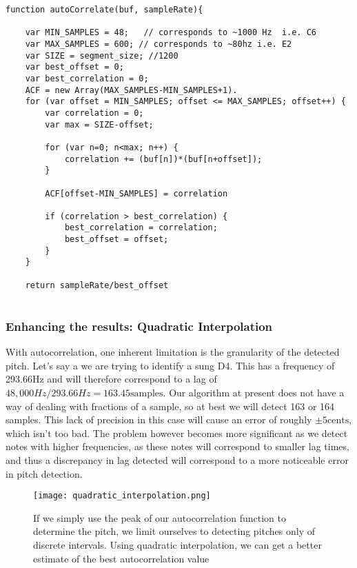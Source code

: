 \begin{lstlisting}
function autoCorrelate(buf, sampleRate){

    var MIN_SAMPLES = 48;	// corresponds to ~1000 Hz  i.e. C6
    var MAX_SAMPLES = 600; // corresponds to ~80hz i.e. E2
    var SIZE = segment_size; //1200
    var best_offset = 0;
    var best_correlation = 0;
    ACF = new Array(MAX_SAMPLES-MIN_SAMPLES+1).
    for (var offset = MIN_SAMPLES; offset <= MAX_SAMPLES; offset++) {
        var correlation = 0;
        var max = SIZE-offset;

        for (var n=0; n<max; n++) {
            correlation += (buf[n])*(buf[n+offset]);
        }

        ACF[offset-MIN_SAMPLES] = correlation

        if (correlation > best_correlation) {
            best_correlation = correlation;
            best_offset = offset;
        }
    }
    
    return sampleRate/best_offset
    
\end{lstlisting}

\subsubsection{Enhancing the results: Quadratic Interpolation}
With autocorrelation, one inherent limitation is the granularity of the detected pitch.
Let's say a we are trying to identify a sung D4. This has a frequency of 293.66Hz and will therefore correspond to a lag of \(48,000Hz/293.66Hz = 163.45 \text{samples}\). Our algorithm at present does not have a way of dealing with fractions of a sample, so at best we will detect 163 or 164 samples. This lack of precision in this case will cause an error of roughly \(\pm 5 \text{cents}\), which isn't too bad. The problem however becomes more significant as we detect notes with higher frequencies, as these notes will correspond to smaller lag times, and thus a discrepancy in lag detected will correspond to a more noticeable error in pitch detection.

\begin{figure}
	\centering
	\texttt{[image: quadratic\_interpolation.png]}
	\caption{If we simply use the peak of our autocorrelation function to determine the pitch, we limit ourselves to detecting pitches only of discrete intervals. Using quadratic interpolation, we can get a better estimate of the best autocorrelation value}
\end{figure}

